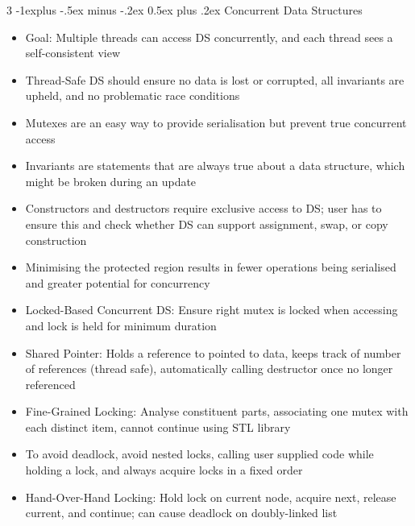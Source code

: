 \documentclass[10pt, landscape]{article}
\makeatletter
\renewcommand{\section}{\@startsection{section}{1}{0mm}%
                                {-1ex plus -.5ex minus -.2ex}%
                                {0.5ex plus .2ex}%
                                {\normalfont\large\bfseries}}
\renewcommand{\section}{\@startsection{section}{2}{0mm}%
                                {-1explus -.5ex minus -.2ex}%
                                {0.5ex plus .2ex}%
                                {\normalfont\normalsize\bfseries}}
\makeatother
\begin{document}
\begin{multicols*}{3}
\section{Concurrent Data Structures}
\begin{itemize}
    \item Goal: Multiple threads can access DS concurrently, and each thread sees a self-consistent view
    \item Thread-Safe DS should ensure no data is lost or corrupted, all invariants are upheld, and no problematic race conditions
    \item Mutexes are an easy way to provide serialisation but prevent true concurrent access
    \item Invariants are statements that are always true about a data structure, which might be broken during an update
    \item Constructors and destructors require exclusive access to DS; user has to ensure this and check whether DS can support assignment, swap, or copy construction
    \item Minimising the protected region results in fewer operations being serialised and greater potential for concurrency
    \item Locked-Based Concurrent DS: Ensure right mutex is locked when accessing and lock is held for minimum duration
    \item Shared Pointer: Holds a reference to pointed to data, keeps track of number of references (thread safe), automatically calling destructor once no longer referenced
    \item Fine-Grained Locking: Analyse constituent parts, associating one mutex with each distinct item, cannot continue using STL library
    \item To avoid deadlock, avoid nested locks, calling user supplied code while holding a lock, and always acquire locks in a fixed order
    \item Hand-Over-Hand Locking: Hold lock on current node, acquire next, release current, and continue; can cause deadlock on doubly-linked list
\end{itemize}


\end{multicols*}
\end{document}
